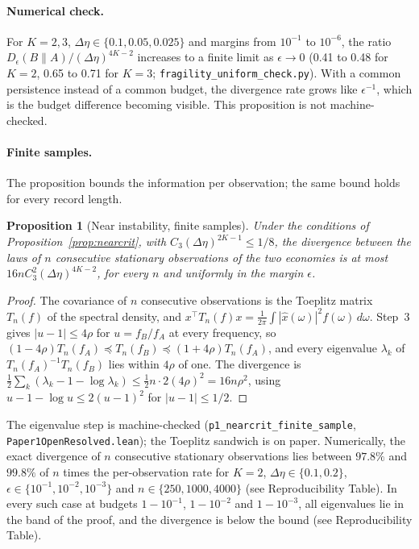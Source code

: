 \documentclass[12pt]{article}
\newtheorem{proposition}[theorem]{Proposition}
\theoremstyle{definition}
\theoremstyle{remark}
\begin{document}
\paragraph{Numerical check.} For $K=2,3$, $\Delta\eta\in\{0.1,0.05,0.025\}$ and margins from $10^{-1}$ to $10^{-6}$, the ratio $D_\epsilon(B\|A)/(\Delta\eta)^{4K-2}$ increases to a finite limit as $\epsilon\to0$ (0.41 to 0.48 for $K=2$, 0.65 to 0.71 for $K=3$; \nolinkurl{fragility_uniform_check.py}). With a common persistence instead of a common budget, the divergence rate grows like $\epsilon^{-1}$, which is the budget difference becoming visible. This proposition is not machine-checked.


\paragraph{Finite samples.} The proposition bounds the information per observation; the same bound holds for every record length.

\begin{proposition}[Near instability, finite samples]\label{prop:nearcritn}
Under the conditions of Proposition~\ref{prop:nearcrit}, with $C_3(\Delta\eta)^{2K-1}\le1/8$, the divergence between the laws of $n$ consecutive stationary observations of the two economies is at most $16nC_3^2(\Delta\eta)^{4K-2}$, for every $n$ and uniformly in the margin $\epsilon$.
\end{proposition}

\begin{proof}
The covariance of $n$ consecutive observations is the Toeplitz matrix $T_n(f)$ of the spectral density, and $x^\top T_n(f)x=\frac1{2\pi}\int|\hat x(\omega)|^2f(\omega)\,d\omega$. Step~3 gives $|u-1|\le4\rho$ for $u=f_B/f_A$ at every frequency, so $(1-4\rho)T_n(f_A)\preceq T_n(f_B)\preceq(1+4\rho)T_n(f_A)$, and every eigenvalue $\lambda_k$ of $T_n(f_A)^{-1}T_n(f_B)$ lies within $4\rho$ of one. The divergence is $\frac12\sum_k(\lambda_k-1-\log\lambda_k)\le\frac12n\cdot2(4\rho)^2=16n\rho^2$, using $u-1-\log u\le2(u-1)^2$ for $|u-1|\le1/2$.
\end{proof}

The eigenvalue step is machine-checked (\texttt{p1\_nearcrit\_finite\_sample}, \nolinkurl{Paper1OpenResolved.lean}); the Toeplitz sandwich is on paper. Numerically, the exact divergence of $n$ consecutive stationary observations lies between $97.8\%$ and $99.8\%$ of $n$ times the per-observation rate for $K=2$, $\Delta\eta\in\{0.1,0.2\}$, $\epsilon\in\{10^{-1},10^{-2},10^{-3}\}$ and $n\in\{250,1000,4000\}$ (see Reproducibility Table). In every such case at budgets $1-10^{-1}$, $1-10^{-2}$ and $1-10^{-3}$, all eigenvalues lie in the band of the proof, and the divergence is below the bound (see Reproducibility Table).
\end{document}
